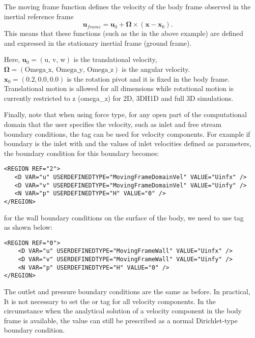 The moving frame function defines the velocity of the body frame observed in the inertial reference frame $$\mathbf{u}_{frame} = \mathbf{u}_0 + \mathbf{\Omega}\times (\mathbf{x}-\mathbf{x}_0).$$ This means that these functions (such as the  in the above example) are defined and expressed in the stationary inertial frame (ground frame).

Here, $\mathbf{u}_0 = (\text{u, v, w})$ is the translational velocity, $\mathbf{\Omega}=(\text{Omega\_x, Omega\_y, Omega\_z})$ is the angular velocity.
$\mathbf{x}_0=(0.2, 0.0, 0.0)$ is the rotation pivot and it is fixed in the body frame.
Translational motion is allowed for all dimensions while rotational motion is currently restricted to z (omega\_z) for 2D, 3DH1D and full 3D simulations.

Finally, note that when using  force type, for any open part of the computational domain that the user specifies the velocity, such as inlet and free stream boundary conditions, the  tag can be used for velocity components. For example if boundary  is the inlet with  and  the values of inlet velocities defined as parameters, the boundary condition for this boundary becomes:

\begin{lstlisting}[style=XMLStyle]
<REGION REF="2"> 
   <D VAR="u" USERDEFINEDTYPE="MovingFrameDomainVel" VALUE="Uinfx" />
   <D VAR="v" USERDEFINEDTYPE="MovingFrameDomainVel" VALUE="Uinfy" />
   <N VAR="p" USERDEFINEDTYPE="H" VALUE="0" />  
</REGION>
\end{lstlisting}

for the wall boundary conditions on the surface of the body, we need to use  tag as shown below:

\begin{lstlisting}[style=XMLStyle]
<REGION REF="0"> 
    <D VAR="u" USERDEFINEDTYPE="MovingFrameWall" VALUE="Uinfx" />
    <D VAR="v" USERDEFINEDTYPE="MovingFrameWall" VALUE="Uinfy" />
    <N VAR="p" USERDEFINEDTYPE="H" VALUE="0" />  
</REGION>
\end{lstlisting}

The outlet and pressure boundary conditions are the same as before. In practical, It is not necessary to set the  or  tag for all velocity components. In the circumstance when the analytical solution of a velocity component in the body frame is available, the value can still be prescribed as a normal Dirichlet-type boundary condition.


